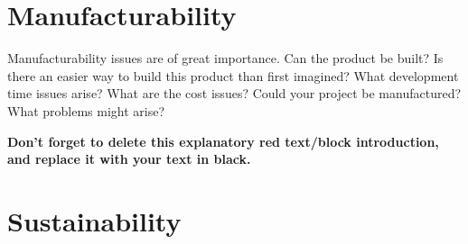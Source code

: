 \section{Manufacturability} %

\begin{tcolorbox}[      %
    boxrule=0pt,        %
    colback=white,      %
    coltext=red         %
]                       %
    Manufacturability issues are of great importance. Can the product be built? Is there an easier way to build this product than first imagined? What development time issues arise? What are the cost issues? Could your project be manufactured? What problems might arise?
    
    \vspace{15pt}       %
    \begin{center}      %
    \textbf{Don't forget to delete this explanatory red text/block introduction, and replace it with your text in black.}
    \end{center}        %
\end{tcolorbox}         %

\section{Sustainability} %

